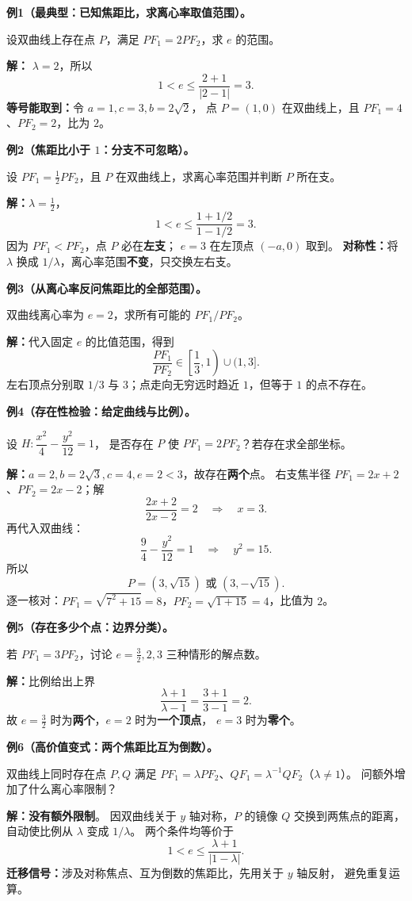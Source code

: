 \clearpage
\begin{examplebox}
\textbf{例1（最典型：已知焦距比，求离心率取值范围）。}

设双曲线上存在点 $P$，满足 $PF_1=2PF_2$，求 $e$ 的范围。

\textbf{解：} $\lambda=2$，所以
\[
\boxed{1<e\le\frac{2+1}{|2-1|}=3}.
\]
\textbf{等号能取到：}令 $a=1,c=3,b=2\sqrt2$，
点 $P=(1,0)$ 在双曲线上，且 $PF_1=4$、$PF_2=2$，比为 $2$。

\medskip
\textbf{例2（焦距比小于 $1$：分支不可忽略）。}

设 $PF_1=\tfrac12PF_2$，且 $P$ 在双曲线上，求离心率范围并判断 $P$ 所在支。

\textbf{解：}$\lambda=\tfrac12$，
\[
\boxed{1<e\le\frac{1+1/2}{1-1/2}=3}.
\]
因为 $PF_1<PF_2$，点 $P$ 必在\textbf{左支}；
$e=3$ 在左顶点 $(-a,0)$ 取到。
\textbf{对称性：}将 $\lambda$ 换成 $1/\lambda$，离心率范围\textbf{不变}，只交换左右支。
\end{examplebox}

\clearpage
\begin{examplebox}
\textbf{例3（从离心率反问焦距比的全部范围）。}

双曲线离心率为 $e=2$，求所有可能的 $PF_1/PF_2$。

\textbf{解：}代入固定 $e$ 的比值范围，得到
\[
\boxed{\frac{PF_1}{PF_2}\in\left[\frac13,1\right)\cup(1,3]}.
\]
左右顶点分别取 $1/3$ 与 $3$；点走向无穷远时趋近 $1$，但等于 $1$ 的点不存在。

\medskip
\textbf{例4（存在性检验：给定曲线与比例）。}

设 $H:\dfrac{x^2}{4}-\dfrac{y^2}{12}=1$，
是否存在 $P$ 使 $PF_1=2PF_2$？若存在求全部坐标。

\textbf{解：}$a=2,b=2\sqrt3,c=4,e=2<3$，故存在\textbf{两个}点。
右支焦半径 $PF_1=2x+2$、$PF_2=2x-2$；解
\[
\frac{2x+2}{2x-2}=2\quad\Longrightarrow\quad x=3.
\]
再代入双曲线：
\[
\frac94-\frac{y^2}{12}=1\quad\Longrightarrow\quad y^2=15.
\]
所以
\[
\boxed{P=(3,\sqrt{15})\text{ 或 }(3,-\sqrt{15})}.
\]
逐一核对：$PF_1=\sqrt{7^2+15}=8$，$PF_2=\sqrt{1+15}=4$，比值为 $2$。
\end{examplebox}

\clearpage
\begin{examplebox}
\textbf{例5（存在多少个点：边界分类）。}

若 $PF_1=3PF_2$，讨论 $e=\frac32,2,3$ 三种情形的解点数。

\textbf{解：}比例给出上界
\[
\frac{\lambda+1}{\lambda-1}=\frac{3+1}{3-1}=2.
\]
故 $e=\frac32$ 时为\textbf{两个}，$e=2$ 时为\textbf{一个顶点}，
$e=3$ 时为\textbf{零个}。

\medskip
\textbf{例6（高价值变式：两个焦距比互为倒数）。}

双曲线上同时存在点 $P,Q$ 满足
$PF_1=\lambda PF_2$、$QF_1=\lambda^{-1}QF_2$（$\lambda\ne1$）。
问额外增加了什么离心率限制？

\textbf{解：}\textbf{没有额外限制}。
因双曲线关于 $y$ 轴对称，$P$ 的镜像 $Q$ 交换到两焦点的距离，
自动使比例从 $\lambda$ 变成 $1/\lambda$。
两个条件均等价于
\[
\boxed{1<e\le\frac{\lambda+1}{|1-\lambda|}}.
\]
\textbf{迁移信号：}涉及对称焦点、互为倒数的焦距比，先用关于 $y$ 轴反射，
避免重复运算。
\end{examplebox}

